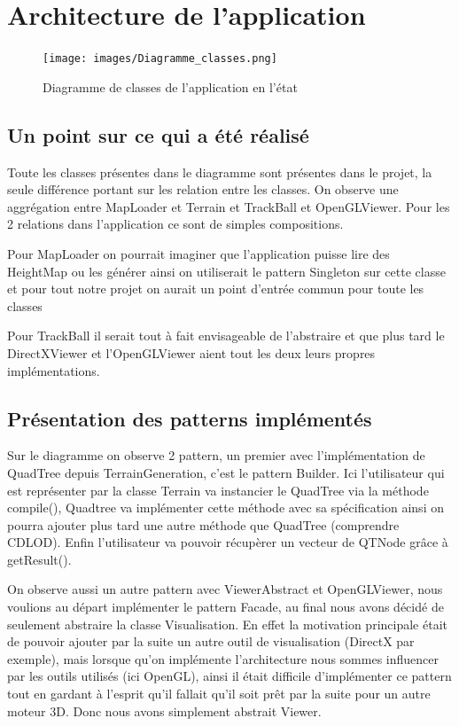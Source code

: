 \documentclass[12pt]{report}
\begin{document}
\newpage

\chapter{Architecture de l'application}
\begin{figure}[h]
    \centering
    \texttt{[image: images/Diagramme\_classes.png]}
    \caption{Diagramme de classes de l'application en l'état}
\end{figure}
\section{Un point sur ce qui a été réalisé}
Toute les classes présentes dans le diagramme sont présentes dans le projet, la seule différence portant sur les relation entre les classes. On observe une aggrégation entre MapLoader et Terrain et TrackBall et OpenGLViewer. Pour les 2 relations dans l'application ce sont de simples compositions. 

Pour MapLoader on pourrait imaginer que l'application puisse lire des HeightMap ou les générer ainsi on utiliserait le pattern Singleton sur cette classe et pour tout notre projet on aurait un point d'entrée commun pour toute les classes

Pour TrackBall il serait tout à fait envisageable de l'abstraire et que plus tard le DirectXViewer et l'OpenGLViewer aient tout les deux leurs propres implémentations.

\section{Présentation des patterns implémentés}
Sur le diagramme on observe 2 pattern, un premier avec l'implémentation de QuadTree depuis TerrainGeneration, c'est le pattern Builder. Ici l'utilisateur qui est représenter par la classe Terrain va instancier le QuadTree via la méthode compile(), Quadtree va implémenter cette méthode avec sa spécification ainsi on pourra ajouter plus tard une autre méthode que QuadTree (comprendre CDLOD). Enfin l'utilisateur va pouvoir récupèrer un vecteur de QTNode grâce à getResult().

On observe aussi un autre pattern avec ViewerAbstract et OpenGLViewer, nous voulions au départ implémenter le pattern Facade, au final nous avons décidé de seulement abstraire la classe Visualisation. En effet la motivation principale était de pouvoir ajouter par la suite un autre outil de visualisation (DirectX par exemple), mais lorsque qu'on implémente l'architecture nous sommes influencer par les outils utilisés (ici OpenGL), ainsi il était difficile d'implémenter ce pattern tout en gardant à l'esprit qu'il fallait qu'il soit prêt par la suite pour un autre moteur 3D. Donc nous avons simplement abstrait Viewer.
\end{document}
